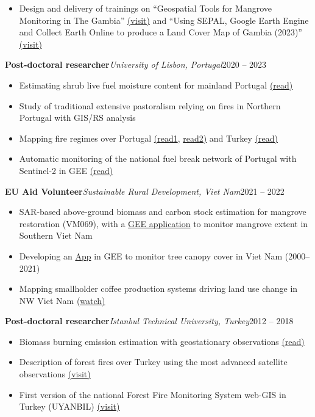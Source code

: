 \documentclass[10pt,a4paper]{article}
\newcommand{\role}[3]{%
  \textbf{#1}\hfill\textcolor{accent}{\textit{#2}}\hfill{#3}\par\vspace{0.15em}}
\begin{document}
\begin{itemize}
\item Design and delivery of trainings on ``Geospatial Tools for Mangrove Monitoring in The Gambia'' \href{https://gambia-geolab.netlify.app/pf2025/}{(visit)} and ``Using SEPAL, Google Earth Engine and Collect Earth Online to produce a Land Cover Map of Gambia (2023)'' \href{https://gambia-geolab.netlify.app/roots2024/}{(visit)}
\end{itemize}

\role{Post-doctoral researcher}{University of Lisbon, Portugal}{2020 -- 2023}
\begin{itemize}
\item Estimating shrub live fuel moisture content for mainland Portugal \href{https://www.mdpi.com/2571-6255/8/5/178}{(read)}
\item Study of traditional extensive pastoralism relying on fires in Northern Portugal with GIS/RS analysis
\item Mapping fire regimes over Portugal \href{https://www.researchgate.net/publication/366124207_Regimes_de_fogo_em_Portugal_Continental}{(read1}, \href{https://www.researchgate.net/publication/360227465_Cartografia_de_Regimes_de_Fogo_a_Escala_da_Freguesia_1980-2017}{read2)} and Turkey \href{https://www.researchgate.net/publication/389813750_Describing_fire_regimes_over_Turkey_using_MODIS_fire_observations}{(read)}
\item Automatic monitoring of the national fuel break network of Portugal with Sentinel-2 in GEE \href{https://link.springer.com/chapter/10.1007/978-3-030-96466-5_5}{(read)}
\end{itemize}

\role{EU Aid Volunteer}{Sustainable Rural Development, Viet Nam}{2021 -- 2022}
\begin{itemize}
\item SAR-based above-ground biomass and carbon stock estimation for mangrove restoration (VM069), with a \href{https://baldassarre.users.earthengine.app/view/srd}{GEE application} to monitor mangrove extent in Southern Viet Nam
\item Developing an \href{https://ee-gibaldassarre.projects.earthengine.app/view/tccvn}{App} in GEE to monitor tree canopy cover in Viet Nam (2000--2021)
\item Mapping smallholder coffee production systems driving land use change in NW Viet Nam \href{https://www.youtube.com/watch?v=i9aKtECsYz8}{(watch)}
\end{itemize}

\role{Post-doctoral researcher}{Istanbul Technical University, Turkey}{2012 -- 2018}
\begin{itemize}
\item Biomass burning emission estimation with geostationary observations \href{https://acp.copernicus.org/articles/15/8539/2015/acp-15-8539-2015.html}{(read)}
\item Description of forest fires over Turkey using the most advanced satellite observations \href{https://fires.itu.edu.tr/bbeurasia/index.html}{(visit)}
\item First version of the national Forest Fire Monitoring System web-GIS in Turkey (UYANBIL) \href{https://fires.itu.edu.tr/}{(visit)}
\end{itemize}
\end{document}

